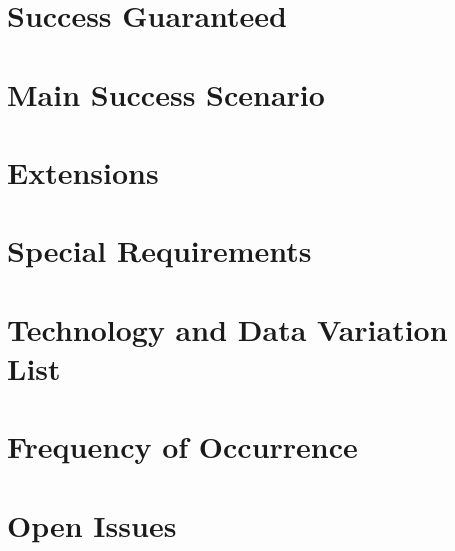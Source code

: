 \documentclass[11pt,a4paper]{article}
\begin{document}
\section{Success Guaranteed}
\section{Main Success Scenario}
\subsection{}
\subsection{}
\section{Extensions}
\subsection{}
\subsection{}
\section{Special Requirements}
\section{Technology and Data Variation List}
\section{Frequency of Occurrence}
\section{Open Issues}
\end{document}
